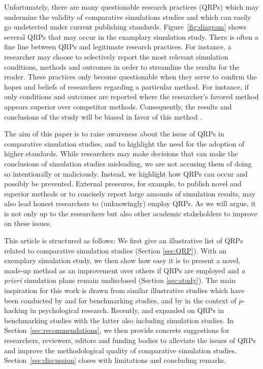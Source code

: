\documentclass[a4paper, 11pt]{article}
\newcommand{\eg}{{e.g.},~}
\begin{document}
Unfortunately, there are many questionable research practices (QRPs) which may
undermine the validity of comparative simulations studies and which can easily
go undetected under current publishing standards. Figure~\ref{fig:diagram} shows
several QRPs that may occur in the examplary simulation study. There is often
a fine line between QRPs and legitimate research practices. For instance, a
researcher may choose to selectively report the most relevant simulation
conditions, methods and outcomes in order to streamline the results for the
reader. These practices only become questionable when they serve to confirm
the hopes and beliefs of researchers regarding a particular method. For instance,
if only conditions and outcomes are reported where the researcher's favored
method appears superior over competitor methods. Consequently, the results and
conclusions of the study will be biased in favor of this method \citep{Niessl2021}.

The aim of this paper is to raise awareness about the issue of QRPs in comparative
simulation studies, and to highlight the need for the adoption of higher standards.
While researchers may make decisions that can make the conclusions of simulation
studies misleading, we are not accusing them of doing so intentionally or
maliciously. Instead, we highlight how QRPs can occur and possibly be prevented.
External pressures, for example, to publish novel and superior methods \citep{Boulesteix2015}
or to concisely report large amounts of simulation results, may also lead honest researchers
to (unknowingly) employ QRPs. As we will argue, it is not only up to the researchers but
also other academic stakeholders to improve on these issues.

This article is structured as follows: We first give an illustrative list of QRPs
related to comparative simulation studies (Section \ref{sec:QRP}). With an
exemplary simulation study, we then show how easy it is to present a novel,
made-up method as an improvement over others if QRPs are employed and
\emph{a priori} simulation plans remain undisclosed (Section \ref{sec:study}).
The main inspiration for this work is drawn from similar illustrative studies
which have been conducted by \citet{Yousefi2009} and \citet{Jelizarow2010}
for benchmarking studies, and by \citet{Simmons2011} in the context of
$p$-hacking in psychological
research. Recently, \citet{Niessl2021} and \citet{Ullmann2022} expanded on
QRPs in benchmarking studies with the latter also including simulation studies.
In Section~\ref{sec:recommendations}, we then provide concrete suggestions for
researchers, reviewers, editors and funding bodies to alleviate the issues of
QRPs and improve the methodological quality of comparative simulation studies.
Section~\ref{sec:discussion} closes with limitations and concluding remarks.
\end{document}
